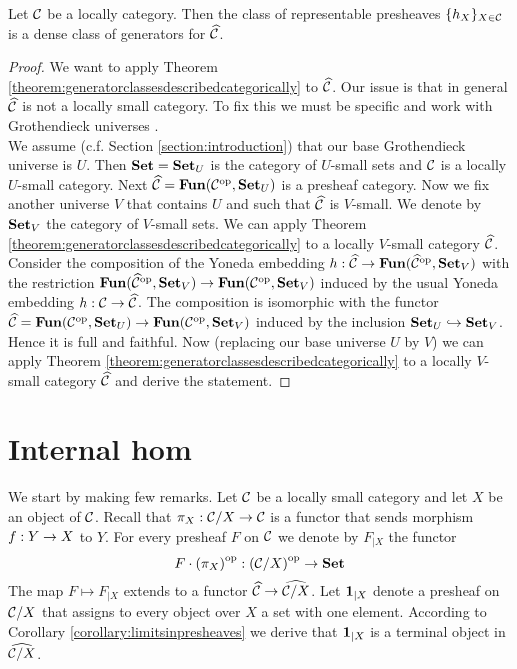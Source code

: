 \begin{corollary}\label{corollary:representablesaredensegenerators}
Let ${\mathcal C}$ be a locally category. Then the class of representable presheaves $\{h_X\}_{X\in {\mathcal C}}$ is a dense class of generators for $\widehat{{\mathcal C}}$.
\end{corollary}
\begin{proof}
We want to apply Theorem \ref{theorem:generatorclassesdescribedcategorically} to $\widehat{{\mathcal C}}$. Our issue is that in general $\widehat{{\mathcal C}}$ is not a locally small category. To fix this we must be specific and work with Grothendieck universes {\cite[page 22]{Maclane}}.\\
We assume (c.f. Section \ref{section:introduction}) that our base Grothendieck universe is $U$. Then $\mathbf{Set} = \mathbf{Set}_{U}$ is the category of $U$-small sets and ${\mathcal C}$ is a locally $U$-small category. Next $\widehat{{\mathcal C}} = \mathbf{Fun}({\mathcal C}^{\mathrm{op}},\mathbf{Set}_{U})$ is a presheaf category. Now we fix another universe $V$ that contains $U$ and such that $\widehat{{\mathcal C}}$ is $V$-small. We denote by $\mathbf{Set}_V$ the category of $V$-small sets. We can apply Theorem \ref{theorem:generatorclassesdescribedcategorically} to a locally $V$-small category $\widehat{{\mathcal C}}$. Consider the composition of the Yoneda embedding $h:\widehat{{\mathcal C}}\rightarrow \mathbf{Fun}(\widehat{{\mathcal C}}^{\mathrm{op}},\mathbf{Set}_V)$ with the restriction $\mathbf{Fun}(\widehat{{\mathcal C}}^{\mathrm{op}},\mathbf{Set}_V)\rightarrow \mathbf{Fun}({\mathcal C}^{\mathrm{op}},\mathbf{Set}_V)$ induced by the usual Yoneda embedding $h:{\mathcal C}\rightarrow \widehat{{\mathcal C}}$. The composition is isomorphic with the functor $\widehat{{\mathcal C}} = \mathbf{Fun}({\mathcal C}^{\mathrm{op}},\mathbf{Set}_U)\rightarrow \mathbf{Fun}({\mathcal C}^{\mathrm{op}},\mathbf{Set}_V)$ induced by the inclusion $\mathbf{Set}_U\hookrightarrow \mathbf{Set}_V$. Hence it is full and faithful. Now (replacing our base universe $U$ by $V$) we can apply Theorem \ref{theorem:generatorclassesdescribedcategorically} to a locally $V$-small category $\widehat{{\mathcal C}}$ and derive the statement.
\end{proof}

\section{Internal hom}
\noindent
We start by making few remarks. Let ${\mathcal C}$ be a locally small category and let $X$ be an object of ${\mathcal C}$. Recall that $\pi_X:{\mathcal C}/X\rightarrow {\mathcal C}$ is a functor that sends morphism $f:Y\rightarrow X$ to $Y$. For every presheaf $F$ on ${\mathcal C}$ we denote by $F_{\mid X}$ the functor
$$F\cdot \left(\pi_X\right)^{\mathrm{op}}:\left({\mathcal C}/X\right)^{\mathrm{op}}\rightarrow \mathbf{Set}$$
The map $F\mapsto F_{\mid X}$ extends to a functor $\widehat{{\mathcal C}}\rightarrow \widehat{{\mathcal C}/X}$.  Let $\mathbf{1}_{\mid X}$ denote a presheaf on ${\mathcal C}/X$ that assigns to every object over $X$ a set with one element. According to Corollary \ref{corollary:limitsinpresheaves} we derive that $\mathbf{1}_{\mid X}$ is a terminal object in $\widehat{{\mathcal C}/X}$. 

